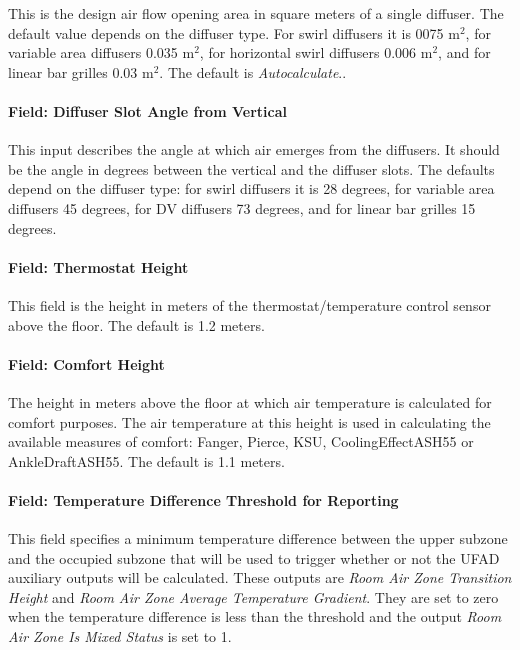 This is the design air flow opening area in square meters of a single diffuser. The default value depends on the diffuser type. For swirl diffusers it is 0075 m\(^{2}\), for variable area diffusers 0.035 m\(^{2}\), for horizontal swirl diffusers 0.006 m\(^{2}\), and for linear bar grilles 0.03 m\(^{2}\). The default is \emph{Autocalculate}..

\paragraph{Field: Diffuser Slot Angle from Vertical}\label{field-diffuser-slot-angle-from-vertical}

This input describes the angle at which air emerges from the diffusers. It should be the angle in degrees between the vertical and the diffuser slots. The defaults depend on the diffuser type: for swirl diffusers it is 28 degrees, for variable area diffusers 45 degrees, for DV diffusers 73 degrees, and for linear bar grilles 15 degrees.

\paragraph{Field: Thermostat Height}\label{field-thermostat-height-2}

This field is the height in meters of the thermostat/temperature control sensor above the floor. The default is 1.2 meters.

\paragraph{Field: Comfort Height}\label{field-comfort-height-1}

The height in meters above the floor at which air temperature is calculated for comfort purposes. The air temperature at this height is used in calculating the available measures of comfort: Fanger, Pierce, KSU, CoolingEffectASH55 or AnkleDraftASH55. The default is 1.1 meters.

\paragraph{Field: Temperature Difference Threshold for Reporting}\label{field-temperature-difference-threshold-for-reporting-1}

This field specifies a minimum temperature difference between the upper subzone and the occupied subzone that will be used to trigger whether or not the UFAD auxiliary outputs will be calculated. These outputs are \emph{Room Air Zone Transition Height} and \emph{Room Air Zone Average Temperature Gradient}. They are set to zero when the temperature difference is less than the threshold and the output \emph{Room Air Zone Is Mixed Status} is set to 1.

